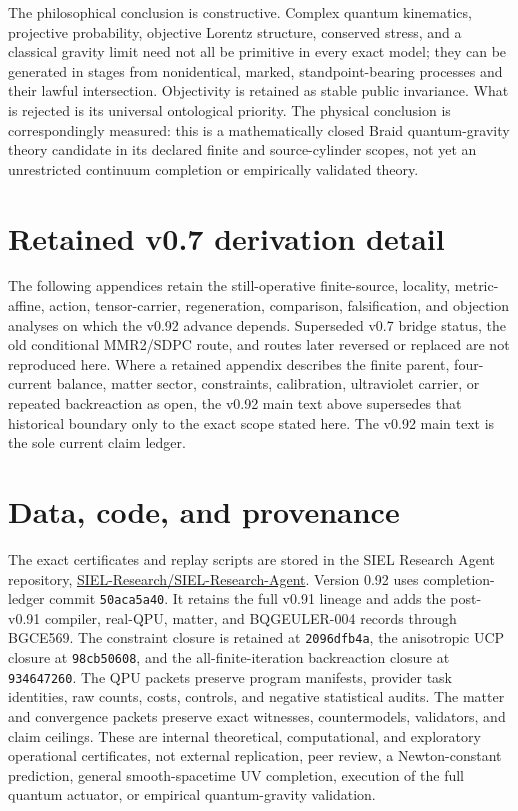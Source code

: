 \documentclass[11pt]{article}
\theoremstyle{definition}
\theoremstyle{remark}
\begin{document}
The philosophical conclusion is constructive. Complex quantum kinematics, projective probability, objective Lorentz structure, conserved stress, and a classical gravity limit need not all be primitive in every exact model; they can be generated in stages from nonidentical, marked, standpoint-bearing processes and their lawful intersection. Objectivity is retained as stable public invariance. What is rejected is its universal ontological priority. The physical conclusion is correspondingly measured: this is a mathematically closed Braid quantum-gravity theory candidate in its declared finite and source-cylinder scopes, not yet an unrestricted continuum completion or empirically validated theory.

\appendix
\section*{Retained v0.7 derivation detail}

The following appendices retain the still-operative finite-source, locality, metric-affine, action, tensor-carrier, regeneration, comparison, falsification, and objection analyses on which the v0.92 advance depends. Superseded v0.7 bridge status, the old conditional MMR2/SDPC route, and routes later reversed or replaced are not reproduced here. Where a retained appendix describes the finite parent, four-current balance, matter sector, constraints, calibration, ultraviolet carrier, or repeated backreaction as open, the v0.92 main text above supersedes that historical boundary only to the exact scope stated here. The v0.92 main text is the sole current claim ledger.



\section*{Data, code, and provenance}

The exact certificates and replay scripts are stored in the SIEL Research Agent repository,
\href{https://github.com/SIEL-Research/SIEL-Research-Agent}{SIEL-Research/SIEL-Research-Agent}. Version 0.92 uses completion-ledger commit \texttt{50aca5a40}. It retains the full v0.91 lineage and adds the post-v0.91 compiler, real-QPU, matter, and BQGEULER-004 records through BGCE569. The constraint closure is retained at \texttt{2096dfb4a}, the anisotropic UCP closure at \texttt{98cb50608}, and the all-finite-iteration backreaction closure at \texttt{934647260}. The QPU packets preserve program manifests, provider task identities, raw counts, costs, controls, and negative statistical audits. The matter and convergence packets preserve exact witnesses, countermodels, validators, and claim ceilings. These are internal theoretical, computational, and exploratory operational certificates, not external replication, peer review, a Newton-constant prediction, general smooth-spacetime UV completion, execution of the full quantum actuator, or empirical quantum-gravity validation.
\end{document}
